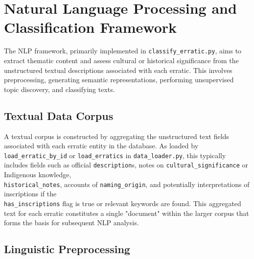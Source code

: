 \documentclass[
11pt, %
english, %
singlespacing, %
headsepline, %
]{MastersDoctoralThesis} %
\begin{document}
\section{Natural Language Processing and Classification Framework}
\label{sec:nlp_framework}

The NLP framework, primarily implemented in \texttt{classify\_erratic.py}, aims to extract thematic content and assess cultural or historical significance from the unstructured textual descriptions associated with each erratic. This involves preprocessing, generating semantic representations, performing unsupervised topic discovery, and classifying texts.

\subsection{Textual Data Corpus}
\label{subsec:corpus}

A textual corpus is constructed by aggregating the unstructured text fields associated with each erratic entity in the database. As loaded by \texttt{load\_erratic\_by\_id} or \texttt{load\_erratics} in \texttt{data\_loader.py}, this typically includes fields such as official \texttt{description}s, notes on \texttt{cultural\_significance} or Indigenous knowledge,\\
\texttt{historical\_notes}, accounts of \texttt{naming\_origin}, and potentially interpretations of inscriptions if the \\
\texttt{has\_inscriptions} flag is true or relevant keywords are found. This aggregated text for each erratic constitutes a single "document" within the larger corpus that forms the basis for subsequent NLP analysis.

\subsection{Linguistic Preprocessing}
\label{subsec:preprocessing}
\end{document}
